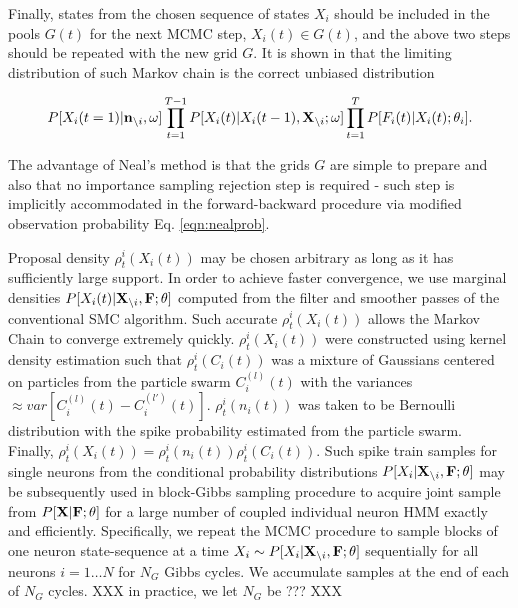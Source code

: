 Finally, states from the chosen sequence of states $X_i$ should be included in the pools $G(t)$ for the next MCMC step, $X_i(t)\in G(t)$, and the above two steps should be repeated with the new grid $G$. It is shown in \cite{NBR03} that the limiting distribution of such Markov chain is the correct unbiased distribution

\begin{equation}
P[X_i(t=1)|{\bf n}_{\backslash i}, \mathbf{\omega}]\prod\limits_{t=1}^{T-1}P[X_i(t)|X_i(t-1), {\bf X}_{\backslash i}; \mathbf{\omega}]\prod\limits_{t=1}^{T}P[F_i(t)|X_i(t); \mathbf{\theta}_i].
\end{equation}

The advantage of Neal's method is that the grids $G$ are simple to prepare and also that no importance sampling rejection step is required - such step is implicitly accommodated in the forward-backward procedure via modified observation probability Eq. \eqref{eqn:nealprob}.

Proposal density $\rho^i_t(X_i(t))$ may be chosen arbitrary as long as it has sufficiently large support.  In order to achieve faster convergence, we use marginal densities $P[X_i(t)|{\bf X}_{\backslash i}, \bf F; \theta]$ computed from the filter and smoother passes of the conventional SMC algorithm. Such accurate $\rho^i_t(X_i(t))$ allows the Markov Chain to converge extremely quickly.  $\rho^i_t(X_i(t))$ were constructed using kernel density estimation such that $\rho^i_t(C_i(t))$ was a mixture of Gaussians centered on particles from the particle swarm $C_i^{(l)}(t)$ with the variances $\approx var\left[C_i^{(l)}(t)-C_i^{(l')}(t) \right]$. $\rho^i_t(n_i(t))$ was taken to be Bernoulli distribution with the spike probability estimated from the particle swarm. Finally, $\rho^i_t(X_i(t)) = \rho^i_t(n_i(t)) \rho^i_t(C_i(t))$.  Such spike train samples for single neurons from the conditional probability distributions $P[X_i|{\bf X}_{\backslash i}, \bf F; \theta]$ may be subsequently used in block-Gibbs sampling procedure to acquire joint sample from $P[{\bf X}| {\bf F}; \theta]$ for a large number of coupled individual neuron HMM exactly and efficiently.  Specifically, we repeat the MCMC procedure to sample blocks of one neuron state-sequence at a time $X_i\sim P[X_{i}|{\bf X}_{\backslash i},{\bf F}; \theta]$ sequentially for all neurons $i=1\ldots N$ for $N_G$ Gibbs cycles.  We accumulate samples at the end of each of $N_G$ cycles.  XXX in practice, we let $N_G$ be ??? XXX


